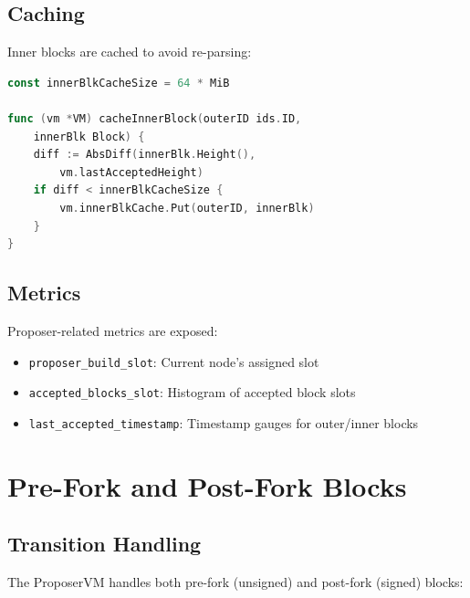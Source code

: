 \documentclass[11pt,letterpaper]{article}
\begin{document}
\subsection{Caching}

Inner blocks are cached to avoid re-parsing:

\begin{lstlisting}[language=Go, caption=Block Caching]
const innerBlkCacheSize = 64 * MiB

func (vm *VM) cacheInnerBlock(outerID ids.ID,
    innerBlk Block) {
    diff := AbsDiff(innerBlk.Height(),
        vm.lastAcceptedHeight)
    if diff < innerBlkCacheSize {
        vm.innerBlkCache.Put(outerID, innerBlk)
    }
}
\end{lstlisting}

\subsection{Metrics}

Proposer-related metrics are exposed:

\begin{itemize}
    \item \texttt{proposer\_build\_slot}: Current node's assigned slot
    \item \texttt{accepted\_blocks\_slot}: Histogram of accepted block slots
    \item \texttt{last\_accepted\_timestamp}: Timestamp gauges for outer/inner blocks
\end{itemize}

\section{Pre-Fork and Post-Fork Blocks}

\subsection{Transition Handling}

The ProposerVM handles both pre-fork (unsigned) and post-fork (signed) blocks:
\end{document}
